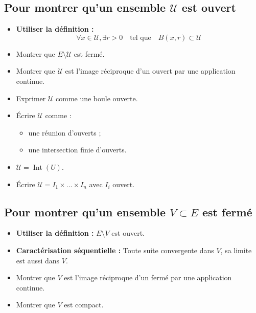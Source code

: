 \documentclass[a4paper]{article}
\begin{document}
\subsection*{Pour montrer qu'un ensemble \(\mathcal{U}\) est ouvert}

\begin{itemize}
    \item \textbf{Utiliser la définition :} 
    \[
    \forall x \in \mathcal{U}, \exists r > 0 \quad \text{tel que} \quad B(x, r) \subset \mathcal{U}
    \]
    
    \item Montrer que \( E \setminus \mathcal{U} \) est fermé.
    
    \item Montrer que \(\mathcal{U}\) est l'image réciproque d'un ouvert par une application continue.
    
    \item Exprimer \(\mathcal{U}\) comme une boule ouverte.
    
    \item Écrire \(\mathcal{U}\) comme :
    \begin{itemize}
        \item une réunion d'ouverts ;
        \item une intersection finie d'ouverts.
    \end{itemize}
    
    \item \(\mathcal{U} = \operatorname{Int}(U)\).
    
    \item Écrire \(\mathcal{U} = I_1 \times \dots \times I_n\) avec \( I_i \) ouvert.
\end{itemize}

\subsection*{Pour montrer qu'un ensemble \(V \subset E\) est fermé}

\begin{itemize}
    \item \textbf{Utiliser la définition :} \( E \setminus V \) est ouvert.
    
    \item \textbf{Caractérisation séquentielle :} Toute suite convergente dans \(V\), sa limite est aussi dans \(V\).
    
    \item Montrer que \(V\) est l'image réciproque d'un fermé par une application continue.
    
    \item Montrer que \(V\) est compact.
\end{itemize}
\end{document}
